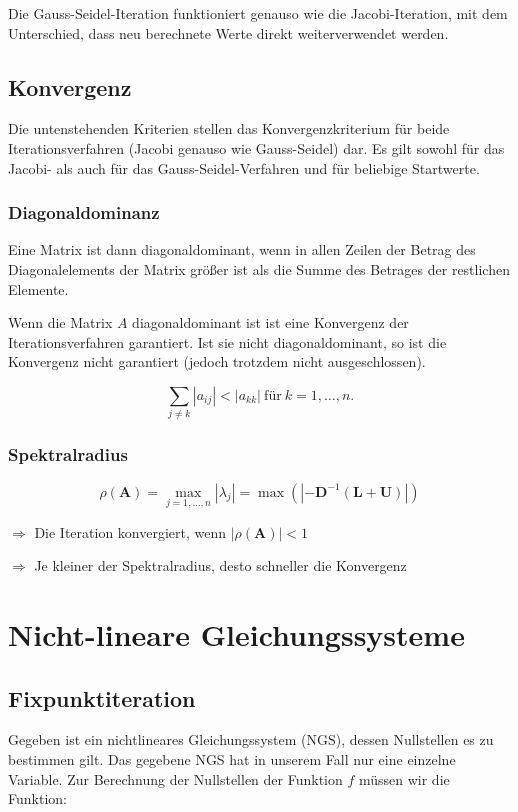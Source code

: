 \documentclass[a4paper, twoside]{article}
\begin{document}
Die Gauss-Seidel-Iteration funktioniert genauso wie die Jacobi-Iteration, mit dem Unterschied, dass neu berechnete Werte direkt weiterverwendet werden.

\subsection{Konvergenz}

Die untenstehenden Kriterien stellen das Konvergenzkriterium für beide Iterationsverfahren (Jacobi genauso wie Gauss-Seidel) dar. Es gilt sowohl für das Jacobi- als auch für das Gauss-Seidel-Verfahren und für beliebige Startwerte.

\subsubsection{Diagonaldominanz}

Eine Matrix ist dann diagonaldominant, wenn in allen Zeilen der Betrag des Diagonalelements der Matrix größer ist als die Summe des Betrages der restlichen Elemente.

Wenn die Matrix \(A\) diagonaldominant ist ist eine Konvergenz der Iterationsverfahren garantiert. Ist sie nicht diagonaldominant, so ist die Konvergenz nicht garantiert (jedoch trotzdem nicht ausgeschlossen).

\[\sum_{j \neq k} |a_{ij}| < |a_{kk}| \ \text{für}\ k = 1, \ldots , n.\]

\subsubsection{Spektralradius}

\[\rho(\mathbf{A}) = \max_{j=1,\ldots,n} |\lambda_{j}| = \max(|-\mathbf{D}^{-1}(\mathbf{L} + \mathbf{U})|)\]

\(\Rightarrow\) Die Iteration konvergiert, wenn \(|\rho(\mathbf{A})| < 1\)

\(\Rightarrow\) Je kleiner der Spektralradius, desto schneller die Konvergenz


\section{Nicht-lineare Gleichungssysteme}

\subsection{Fixpunktiteration}

Gegeben ist ein nichtlineares Gleichungssystem (NGS), dessen Nullstellen es zu bestimmen gilt. Das gegebene NGS hat in unserem Fall nur eine einzelne Variable. Zur Berechnung der Nullstellen der Funktion \(f\) müssen wir die Funktion:
\end{document}

